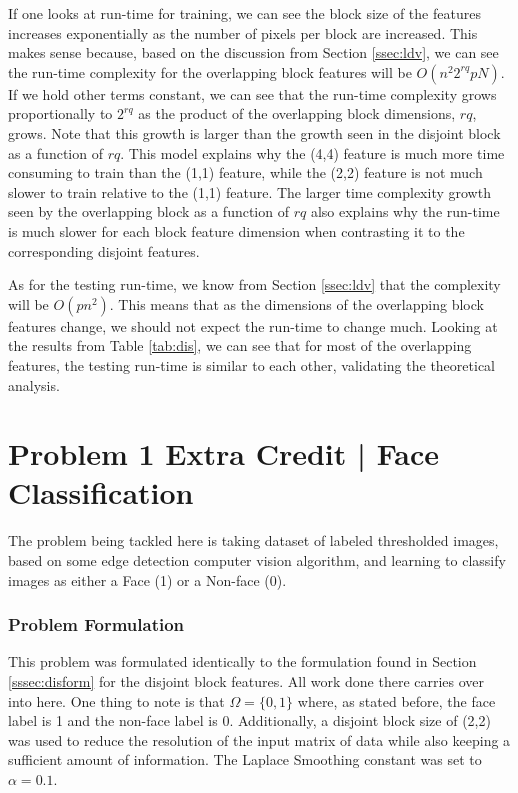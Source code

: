 \documentclass{article}[12pt]
\begin{document}
   If one looks at run-time for training, we can see the block size of the features increases exponentially as the number of pixels per block are increased. This makes sense because, based on the discussion from Section \ref{ssec:ldv}, we can see the run-time complexity for the overlapping block features will be $O(n^2 2^{rq} p N)$. If we hold other terms constant, we can see that the run-time complexity grows proportionally to $2^{rq}$ as the product of the overlapping block dimensions, $rq$, grows. Note that this growth is larger than the growth seen in the disjoint block as a function of $rq$. This model explains why the (4,4) feature is much more time consuming to train than the (1,1) feature, while the (2,2) feature is not much slower to train relative to the (1,1) feature. The larger time complexity growth seen by the overlapping block as a function of $rq$ also explains why the run-time is much slower for each block feature dimension when contrasting it to the corresponding disjoint features.
   
   As for the testing run-time, we know from Section \ref{ssec:ldv} that the complexity will be $O\left(p n^2\right)$. This means that as the dimensions of the overlapping block features change, we should not expect the run-time to change much. Looking at the results from Table \ref{tab:dis}, we can see that for most of the overlapping features, the testing run-time is similar to each other, validating the theoretical analysis.
   
   \section{Problem 1 Extra Credit | Face Classification}
   The problem being tackled here is taking dataset of labeled thresholded images, based on some edge detection computer vision algorithm, and learning to classify images as either a Face (1) or a Non-face (0). 
   
   \subsubsection{Problem Formulation}
   This problem was formulated identically to the formulation found in Section \ref{sssec:disform} for the disjoint block features. All work done there carries over into here. One thing to note is that $\Omega = \lbrace 0, 1\rbrace$ where, as stated before, the face label is 1 and the non-face label is 0. Additionally, a disjoint block size of (2,2) was used to reduce the resolution of the input matrix of data while also keeping a sufficient amount of information. The Laplace Smoothing constant was set to $\alpha = 0.1$.
   
\end{document}
